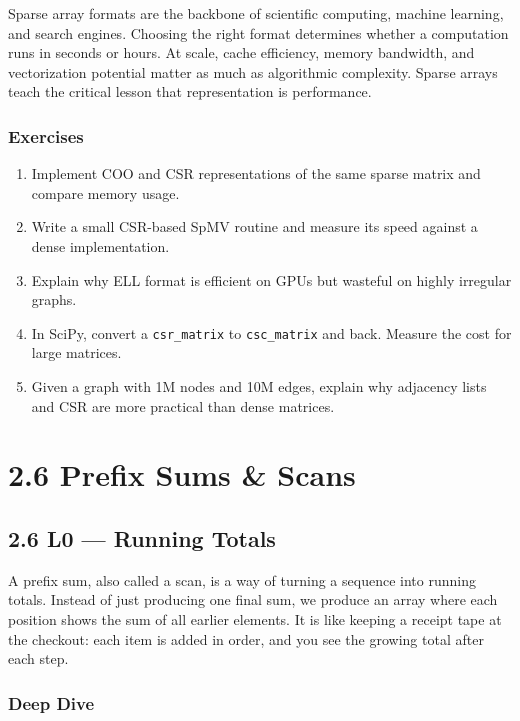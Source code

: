 \documentclass[
  letterpaper,
  DIV=11,
  numbers=noendperiod]{scrreprt}
\providecommand{\tightlist}{%
  \setlength{\itemsep}{0pt}\setlength{\parskip}{0pt}}
\begin{document}
Sparse array formats are the backbone of scientific computing, machine
learning, and search engines. Choosing the right format determines
whether a computation runs in seconds or hours. At scale, cache
efficiency, memory bandwidth, and vectorization potential matter as much
as algorithmic complexity. Sparse arrays teach the critical lesson that
representation is performance.

\subsubsection{Exercises}\label{exercises-26}

\begin{enumerate}
\def\labelenumi{\arabic{enumi}.}
\tightlist
\item
  Implement COO and CSR representations of the same sparse matrix and
  compare memory usage.
\item
  Write a small CSR-based SpMV routine and measure its speed against a
  dense implementation.
\item
  Explain why ELL format is efficient on GPUs but wasteful on highly
  irregular graphs.
\item
  In SciPy, convert a \texttt{csr\_matrix} to \texttt{csc\_matrix} and
  back. Measure the cost for large matrices.
\item
  Given a graph with 1M nodes and 10M edges, explain why adjacency lists
  and CSR are more practical than dense matrices.
\end{enumerate}

\section{2.6 Prefix Sums \& Scans}\label{prefix-sums-scans}

\subsection{2.6 L0 --- Running Totals}\label{l0-running-totals}

A prefix sum, also called a scan, is a way of turning a sequence into
running totals. Instead of just producing one final sum, we produce an
array where each position shows the sum of all earlier elements. It is
like keeping a receipt tape at the checkout: each item is added in
order, and you see the growing total after each step.

\subsubsection{Deep Dive}\label{deep-dive-18}
\end{document}
